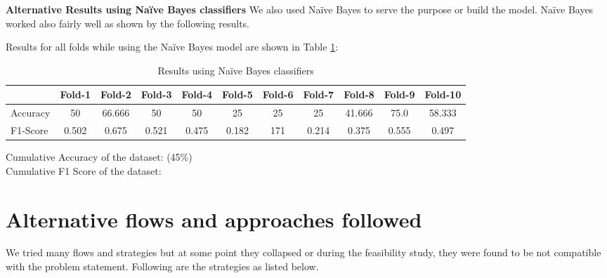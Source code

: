 \textbf{Alternative Results using Naïve Bayes classifiers}
\hfil \break
We also used Naïve Bayes to serve the purpose or build the model. Naïve Bayes worked also fairly well as shown by the following results.

Results for all folds while using the  Naïve Bayes model are shown in Table \ref{naviebayes}:
\begin{table}[h]
	
\begin{adjustbox}{max width=\textwidth}
	\begin{tabular}{ |p{1.7cm}|c|c|c|c|c|c|c|c|c|c|} 
		\hline
		&  Fold-1 &  Fold-2 &  Fold-3&  Fold-4&  Fold-5&  Fold-6 &  Fold-7	 &  Fold-8&  Fold-9 &  Fold-10     \\ 
		\hline
		Accuracy &  50  &	66.666	& 50	& 50	& 25	& 25	& 25	& 41.666	& 75.0	& 58.333\\ 
		\hline
		F1-Score & 0.502 &	0.675	& 0.521 &	0.475 &	0.182	& 171	& 0.214	& 0.375	& 0.555	& 0.497 \\ 
		\hline
	\end{tabular}
\end{adjustbox}

	\caption{Results using  Naïve Bayes classifiers\label{naviebayes}}
\end{table}

\hfil \break
 Cumulative Accuracy of the dataset:	\quad{} (45\%) \\
Cumulative F1 Score of the dataset:	\quad{} \\




\section{Alternative flows and approaches followed}
We tried many flows and strategies but at some point they collapsed or during the feasibility study, they were found to be not compatible with the problem statement. Following are the strategies as listed below.


